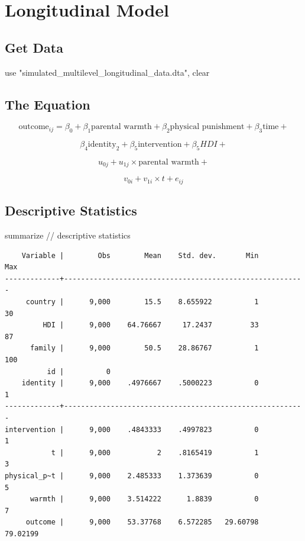 \documentclass[
  letterpaper,
  DIV=11,
  numbers=noendperiod]{scrreprt}
\newenvironment{Shaded}{\begin{snugshade}}{\end{snugshade}}
\newcommand{\CommentTok}[1]{\textcolor[rgb]{0.37,0.37,0.37}{#1}}
\newcommand{\KeywordTok}[1]{\textcolor[rgb]{0.00,0.23,0.31}{#1}}
\newcommand{\NormalTok}[1]{\textcolor[rgb]{0.00,0.23,0.31}{#1}}
\newcommand{\StringTok}[1]{\textcolor[rgb]{0.13,0.47,0.30}{#1}}
\begin{document}
\section{Longitudinal Model}\label{longitudinal-model}

\subsection{Get Data}\label{get-data-1}

\begin{Shaded}
\begin{Highlighting}[]

\KeywordTok{use} \StringTok{"simulated\_multilevel\_longitudinal\_data.dta"}\NormalTok{, }\KeywordTok{clear}
\end{Highlighting}
\end{Shaded}

\subsection{The Equation}\label{the-equation-1}

\[\text{outcome}_{ij} = \beta_0 + \beta_1 \text{parental warmth} + \beta_2 \text{physical punishment} + \beta_3 \text{time} + \]

\[\beta_4 \text{identity}_2 + \beta_5 \text{intervention} + \beta_5 HDI +\]

\[u_{0j} + u_{1j} \times \text{parental warmth} + \]

\[v_{0i} + v_{1i} \times t + e_{ij} \]

\subsection{Descriptive Statistics}\label{descriptive-statistics-1}

\begin{Shaded}
\begin{Highlighting}[]

\KeywordTok{summarize} \CommentTok{// descriptive statistics}
\end{Highlighting}
\end{Shaded}

\begin{verbatim}
    Variable |        Obs        Mean    Std. dev.       Min        Max
-------------+---------------------------------------------------------
     country |      9,000        15.5    8.655922          1         30
         HDI |      9,000    64.76667     17.2437         33         87
      family |      9,000        50.5    28.86767          1        100
          id |          0
    identity |      9,000    .4976667    .5000223          0          1
-------------+---------------------------------------------------------
intervention |      9,000    .4843333    .4997823          0          1
           t |      9,000           2    .8165419          1          3
physical_p~t |      9,000    2.485333    1.373639          0          5
      warmth |      9,000    3.514222      1.8839          0          7
     outcome |      9,000    53.37768    6.572285   29.60798   79.02199
\end{verbatim}
\end{document}
